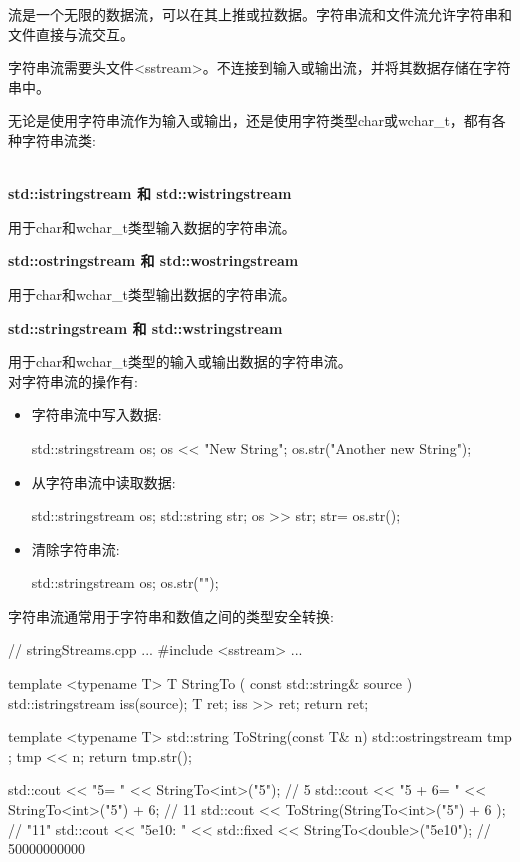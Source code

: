 流是一个无限的数据流，可以在其上推或拉数据。字符串流和文件流允许字符串和文件直接与流交互。


字符串流需要头文件<sstream>。不连接到输入或输出流，并将其数据存储在字符串中。

无论是使用字符串流作为输入或输出，还是使用字符类型char或wchar\_t，都有各种字符串流类:

\noindent
\\\textbf{std::istringstream 和 std::wistringstream}

用于char和wchar\_t类型输入数据的字符串流。

\noindent
\textbf{std::ostringstream 和 std::wostringstream}

用于char和wchar\_t类型输出数据的字符串流。

\noindent
\textbf{std::stringstream 和 std::wstringstream}

用于char和wchar\_t类型的输入或输出数据的字符串流。\\

对字符串流的操作有:

\begin{itemize}
\item 
字符串流中写入数据:

\begin{cpp}
std::stringstream os;
os << "New String";
os.str("Another new String");
\end{cpp}

\item 
从字符串流中读取数据:

\begin{cpp}
std::stringstream os;
std::string str;
os >> str;
str= os.str();
\end{cpp}

\item 
清除字符串流:

\begin{cpp}
std::stringstream os;
os.str("");
\end{cpp}
\end{itemize}

字符串流通常用于字符串和数值之间的类型安全转换:


\begin{cpp}
// stringStreams.cpp
...
#include <sstream>
...

template <typename T>
T StringTo ( const std::string& source ){
	std::istringstream iss(source);
	T ret;
	iss >> ret;
	return ret;
}

template <typename T>
std::string ToString(const T& n){
	std::ostringstream tmp ;
	tmp << n;
	return tmp.str();
}

std::cout << "5= " << StringTo<int>("5"); // 5
std::cout << "5 + 6= " << StringTo<int>("5") + 6; // 11
std::cout << ToString(StringTo<int>("5") + 6 ); // "11"
std::cout << "5e10: " << std::fixed << StringTo<double>("5e10"); // 50000000000
\end{cpp}

